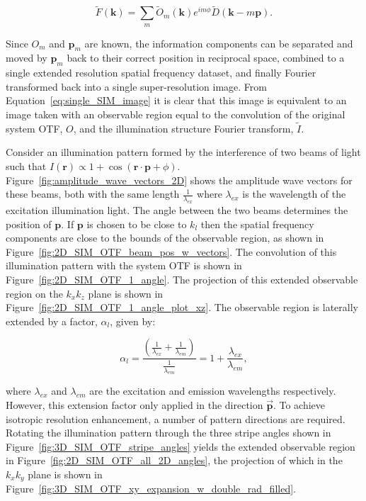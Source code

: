 \begin{equation}\label{eq:single_SIM_image_simple}
\tilde{F}(\textbf{k}) = \sum\limits_{m}{\tilde{O}_{m}(\textbf{k})e^{im\phi}\tilde{D}\left(\textbf{k} - m\textbf{p}\right)}.
\end{equation}

Since $O_{m}$ and $\textbf{p}_{m}$ are known, the information components
can be separated and moved by $\textbf{p}_{m}$ back to their correct 
position in reciprocal space, combined to a single extended resolution
spatial frequency dataset, and finally Fourier transformed back into a 
single super-resolution image.  From Equation~\ref{eq:single_SIM_image} 
it is clear that this image is equivalent to an image taken with an 
observable region equal to the convolution of the original system OTF, 
$O$, and the illumination structure Fourier transform, $\tilde{I}$. 

Consider an illumination pattern formed by the interference of two beams 
of light such that $I(\textbf{r}) \propto 1 + \cos(\textbf{r}\cdot
\textbf{p} + \phi)$. Figure~\ref{fig:amplitude_wave_vectors_2D} shows 
the amplitude wave vectors for these beams, both with the same length 
$\frac{1}{\lambda_{ex}}$ where $\lambda_{ex}$ is the wavelength of the 
excitation illumination light. The angle between the two beams determines 
the position of $\textbf{p}$. If $\textbf{p}$ is chosen to be close to 
$k_{l}$ then the spatial frequency components are close to the bounds 
of the observable region, as shown in 
Figure~\ref{fig:2D_SIM_OTF_beam_pos_w_vectors}. The convolution of this 
illumination pattern with the system OTF is shown in 
Figure~\ref{fig:2D_SIM_OTF_1_angle}. The projection of this extended 
observable region on the $k_{x}k_{z}$ plane is shown in 
Figure~\ref{fig:2D_SIM_OTF_1_angle_plot_xz}. The observable region
is laterally extended by a factor, $\alpha_{l}$, given by:

\begin{equation}\label{eq:lateral_res_extension_factor}
\alpha_{l} = \frac{\left(\frac{1}{\lambda_{ex}} + \frac{1}{\lambda_{em}}\right)}{\frac{1}{\lambda_{em}}} = 1 + \frac{\lambda_{ex}}{\lambda_{em}},
\end{equation}

where $\lambda_{ex}$ and $\lambda_{em}$ are the excitation and emission
wavelengths respectively.  However, this extension factor only applied in 
the direction $\overrightarrow{\textbf{p}}$. To achieve isotropic 
resolution enhancement, a number of pattern directions are required. 
Rotating the illumination pattern through the three stripe angles shown 
in Figure~\ref{fig:3D_SIM_OTF_stripe_angles} yields the extended 
observable region in Figure~\ref{fig:2D_SIM_OTF_all_2D_angles}, the 
projection of which in the $k_{x}k_{y}$ plane is shown in
Figure~\ref{fig:3D_SIM_OTF_xy_expansion_w_double_rad_filled}. 

